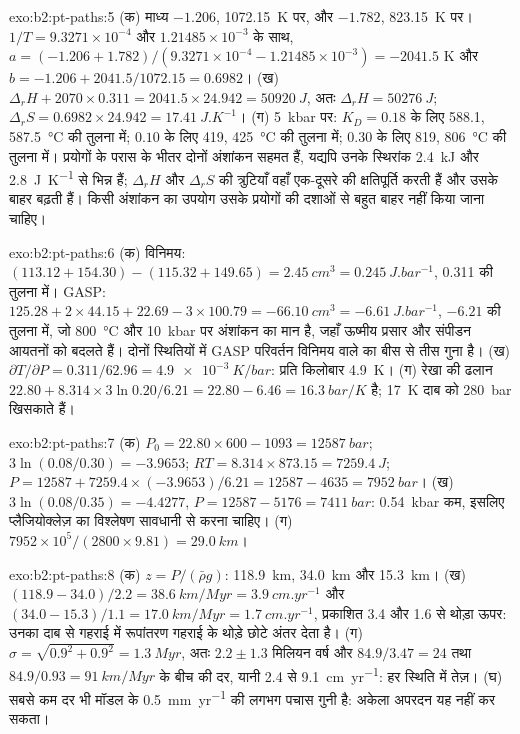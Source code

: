 \begin{solution}{exo:b2:pt-paths:5}
(क) माध्य $-1.206$, \qty{1072.15}{K} पर, और $-1.782$, \qty{823.15}{K} पर। $1/T =
9.3271\times10^{-4}$ और $1.21485\times10^{-3}$ के साथ, $a = (-1.206 + 1.782)/(9.3271\times10^{-4}
- 1.21485\times10^{-3}) = -2041.5$ K और $b = -1.206 + 2041.5/1072.15 = 0.6982$।
(ख) $\Delta_r H + 2070\times0.311 = 2041.5\times24.942 = \qty{50920}{J}$, अतः $\Delta_r H =
\qty{50276}{J}$; $\Delta_r S = 0.6982\times24.942 = \qty{17.41}{J.K^{-1}}$। (ग)
\qty{5}{kbar} पर: $K_D = 0.18$ के लिए 588.1, \qty{587.5}{\celsius} की तुलना में; $0.10$ के लिए 419,
\qty{425}{\celsius} की तुलना में; $0.30$ के लिए 819, \qty{806}{\celsius} की तुलना में। प्रयोगों के परास
के भीतर दोनों अंशांकन सहमत हैं, यद्यपि उनके स्थिरांक
\qty{2.4}{kJ} और \qty{2.8}{J.K^{-1}} से भिन्न हैं; $\Delta_r H$ और $\Delta_r S$ की त्रुटियाँ
वहाँ एक-दूसरे की क्षतिपूर्ति करती हैं और उसके बाहर बढ़ती हैं। किसी अंशांकन का उपयोग उसके प्रयोगों की
दशाओं से बहुत बाहर नहीं किया जाना चाहिए।
\end{solution}

\begin{solution}{exo:b2:pt-paths:6}
(क) विनिमय: $(113.12 + 154.30) - (115.32 + 149.65) = \qty{+2.45}{cm^3} =
\qty{0.245}{J.bar^{-1}}$, 0.311 की तुलना में। GASP: $125.28 + 2\times44.15 + 22.69 -
3\times100.79 = \qty{-66.10}{cm^3} = \qty{-6.61}{J.bar^{-1}}$, $-6.21$ की तुलना में, जो
\qty{800}{\celsius} और \qty{10}{kbar} पर अंशांकन का मान है, जहाँ ऊष्मीय प्रसार और
संपीडन आयतनों को बदलते हैं। दोनों स्थितियों में GASP परिवर्तन विनिमय वाले का बीस से तीस गुना
है। (ख) $\partial T/\partial P = 0.311/62.96 = \qty{4.9e-3}{K/bar}$:
प्रति किलोबार \qty{4.9}{K}। (ग) रेखा की ढलान $22.80 + 8.314\times3\ln 0.20/6.21
= 22.80 - 6.46 = \qty{16.3}{bar/K}$ है; \qty{17}{K} दाब को
\qty{280}{bar} खिसकाते हैं।
\end{solution}

\begin{solution}{exo:b2:pt-paths:7}
(क) $P_0 = 22.80\times600 - 1093 = \qty{12587}{bar}$; $3\ln(0.08/0.30) = -3.9653$; $RT =
8.314\times873.15 = \qty{7259.4}{J}$; $P = 12587 + 7259.4\times(-3.9653)/6.21 = 12587 -
4635 = \qty{7952}{bar}$। (ख) $3\ln(0.08/0.35) = -4.4277$, $P = 12587 - 5176 =
\qty{7411}{bar}$: \qty{0.54}{kbar} कम, इसलिए प्लैजियोक्लेज़ का विश्लेषण सावधानी से करना चाहिए।
(ग) $7952\times10^5/(2800\times9.81) = \qty{29.0}{km}$।
\end{solution}

\begin{solution}{exo:b2:pt-paths:8}
(क) $z = P/(\bar\rho g)$: \qty{118.9}{km}, \qty{34.0}{km} और \qty{15.3}{km}।
(ख) $(118.9 - 34.0)/2.2 = \qty{38.6}{km/Myr} = \qty{3.9}{cm.yr^{-1}}$ और $(34.0 -
15.3)/1.1 = \qty{17.0}{km/Myr} = \qty{1.7}{cm.yr^{-1}}$, प्रकाशित 3.4 और 1.6 से थोड़ा
ऊपर: उनका दाब से गहराई में रूपांतरण गहराई के थोड़े छोटे
अंतर देता है। (ग) $\sigma = \sqrt{0.9^2 + 0.9^2} = \qty{1.3}{Myr}$, अतः $2.2 \pm 1.3$
मिलियन वर्ष और $84.9/3.47 = 24$ तथा $84.9/0.93 = \qty{91}{km/Myr}$ के बीच की दर,
यानी 2.4 से \qty{9.1}{cm.yr^{-1}}: हर स्थिति में तेज़। (घ) सबसे कम दर भी मॉडल के \qty{0.5}{mm.yr^{-1}}
की लगभग पचास गुनी है: अकेला अपरदन यह नहीं कर सकता।
\end{solution}

